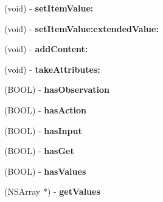 \begin{DoxyCompactItemize}
\item 
\hypertarget{interface_i_d_r_item_aa4dab093203c2c80917ee8efce911a1f}{
(void) -\/ {\bfseries setItemValue:}}
\label{interface_i_d_r_item_aa4dab093203c2c80917ee8efce911a1f}

\item 
\hypertarget{interface_i_d_r_item_a99a843e7a0351f9e72073f6096f4aecb}{
(void) -\/ {\bfseries setItemValue:extendedValue:}}
\label{interface_i_d_r_item_a99a843e7a0351f9e72073f6096f4aecb}

\item 
\hypertarget{interface_i_d_r_item_adfaa4a7c56693e4dff8bd79b4e040cc2}{
(void) -\/ {\bfseries addContent:}}
\label{interface_i_d_r_item_adfaa4a7c56693e4dff8bd79b4e040cc2}

\item 
\hypertarget{interface_i_d_r_item_a74061b5aab67d8c9a3cb2053d3ea263e}{
(void) -\/ {\bfseries takeAttributes:}}
\label{interface_i_d_r_item_a74061b5aab67d8c9a3cb2053d3ea263e}

\item 
\hypertarget{interface_i_d_r_item_a09ad773c6cb273201183b4896ff1578c}{
(BOOL) -\/ {\bfseries hasObservation}}
\label{interface_i_d_r_item_a09ad773c6cb273201183b4896ff1578c}

\item 
\hypertarget{interface_i_d_r_item_a16cb0c0a0d7ac468399c52ae36fbd267}{
(BOOL) -\/ {\bfseries hasAction}}
\label{interface_i_d_r_item_a16cb0c0a0d7ac468399c52ae36fbd267}

\item 
\hypertarget{interface_i_d_r_item_a231820a85ce01c93c0c65bc3fb1ee34f}{
(BOOL) -\/ {\bfseries hasInput}}
\label{interface_i_d_r_item_a231820a85ce01c93c0c65bc3fb1ee34f}

\item 
\hypertarget{interface_i_d_r_item_af6e434929fb6c05e5d76d88207c8e015}{
(BOOL) -\/ {\bfseries hasGet}}
\label{interface_i_d_r_item_af6e434929fb6c05e5d76d88207c8e015}

\item 
\hypertarget{interface_i_d_r_item_a369eeb5f1c64003cd036f2c7b1e966e7}{
(BOOL) -\/ {\bfseries hasValues}}
\label{interface_i_d_r_item_a369eeb5f1c64003cd036f2c7b1e966e7}

\item 
\hypertarget{interface_i_d_r_item_a6cbd7856c5f69b37201fcf227026d506}{
(NSArray $\ast$) -\/ {\bfseries getValues}}
\label{interface_i_d_r_item_a6cbd7856c5f69b37201fcf227026d506}

\end{DoxyCompactItemize}
